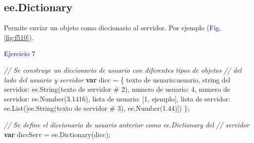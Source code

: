 \documentclass[
  12pt,
  letterpaper,
  twoside]{book}
\newenvironment{Shaded}{\begin{snugshade}}{\end{snugshade}}
\newcommand{\CommentTok}[1]{\textcolor[rgb]{0.24,0.58,0.00}{\textit{#1}}}
\newcommand{\ControlFlowTok}[1]{\textcolor[rgb]{0.00,0.00,0.00}{\textbf{#1}}}
\newcommand{\DecValTok}[1]{\textcolor[rgb]{0.28,0.53,0.93}{#1}}
\newcommand{\FloatTok}[1]{\textcolor[rgb]{0.28,0.53,0.93}{#1}}
\newcommand{\FunctionTok}[1]{\textcolor[rgb]{0.48,0.12,0.64}{#1}}
\newcommand{\KeywordTok}[1]{\textcolor[rgb]{0.48,0.12,0.64}{#1}}
\newcommand{\NormalTok}[1]{#1}
\newcommand{\OperatorTok}[1]{\textcolor[rgb]{0.00,0.00,0.00}{#1}}
\newcommand{\StringTok}[1]{\textcolor[rgb]{0.87,0.29,0.22}{#1}}
\begin{document}
\hypertarget{ee.dictionary}{%
\subsection*{ee.Dictionary}\label{ee.dictionary}}

Permite enviar un objeto como diccionario al servidor. Por ejemplo (\textcolor{darkblue}{Fig.} \ref{fig:f510}).

\textcolor{darkblue}{Ejercicio 7}

\begin{Shaded}
\begin{Highlighting}[]
\CommentTok{// Se construye un diccionario de usuario con diferentes tipos de objetos}
\CommentTok{// del lado del usuario y servidor}
\ControlFlowTok{var}\NormalTok{ dicc }\OperatorTok{=}\NormalTok{ \{                                                 }
  \StringTok{\textquotesingle{}texto de usuario\textquotesingle{}}\OperatorTok{:}\StringTok{\textquotesingle{}usuario\textquotesingle{}}\OperatorTok{,}
  \StringTok{\textquotesingle{}string del servidor\textquotesingle{}}\OperatorTok{:} \KeywordTok{ee}\OperatorTok{.}\FunctionTok{String}\NormalTok{(}\StringTok{\textquotesingle{}texto de servidor \# 2\textquotesingle{}}\NormalTok{)}\OperatorTok{,}
  \StringTok{\textquotesingle{}numero de usuario\textquotesingle{}}\OperatorTok{:} \DecValTok{4}\OperatorTok{,}
  \StringTok{\textquotesingle{}numero de servidor\textquotesingle{}}\OperatorTok{:} \KeywordTok{ee}\OperatorTok{.}\FunctionTok{Number}\NormalTok{(}\FloatTok{3.1416}\NormalTok{)}\OperatorTok{,}
  \StringTok{\textquotesingle{}lista de usuario\textquotesingle{}}\OperatorTok{:}\NormalTok{ [}\DecValTok{1}\OperatorTok{,} \StringTok{\textquotesingle{}ejemplo\textquotesingle{}}\NormalTok{]}\OperatorTok{,}
  \StringTok{\textquotesingle{}lista de servidor\textquotesingle{}}\OperatorTok{:} \KeywordTok{ee}\OperatorTok{.}\FunctionTok{List}\NormalTok{([}\KeywordTok{ee}\OperatorTok{.}\FunctionTok{String}\NormalTok{(}\StringTok{\textquotesingle{}texto de servidor \# 3\textquotesingle{}}\NormalTok{)}\OperatorTok{,} 
    \KeywordTok{ee}\OperatorTok{.}\FunctionTok{Number}\NormalTok{(}\FloatTok{1.44}\NormalTok{)])}
\NormalTok{\}}\OperatorTok{;} 

\CommentTok{// Se define el diccionario de usuario anterior como ee.Dictionary del }
\CommentTok{// servidor }
\ControlFlowTok{var}\NormalTok{ diccServ }\OperatorTok{=} \KeywordTok{ee}\OperatorTok{.}\FunctionTok{Dictionary}\NormalTok{(dicc)}\OperatorTok{;}     
\end{Highlighting}
\end{Shaded}
\end{document}
